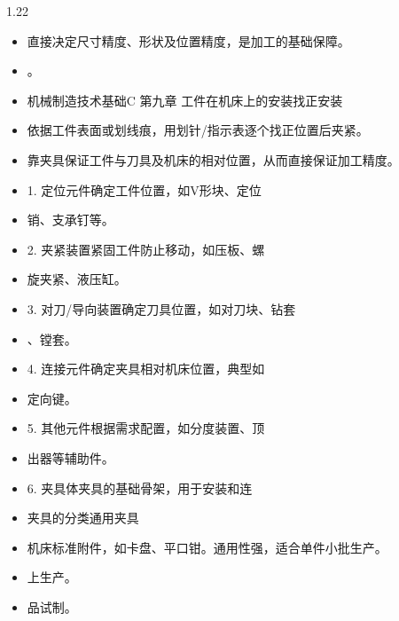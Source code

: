 \documentclass[12pt,a4paper]{article}
\begin{document}
\begin{spacing}{1.22}
\begin{itemize}[leftmargin=2.2em,label=--]
  \item 直接决定尺寸精度、形状及位置精度，是加工的基础保障。
  \item 。
  \item 机械制造技术基础C 第九章 工件在机床上的安装找正安装
  \item 依据工件表面或划线痕，用划针/指示表逐个找正位置后夹紧。
  \item 靠夹具保证工件与刀具及机床的相对位置，从而直接保证加工精度。
  \item 1. 定位元件确定工件位置，如V形块、定位
  \item 销、支承钉等。
  \item 2. 夹紧装置紧固工件防止移动，如压板、螺
  \item 旋夹紧、液压缸。
  \item 3. 对刀/导向装置确定刀具位置，如对刀块、钻套
  \item 、镗套。
  \item 4. 连接元件确定夹具相对机床位置，典型如
  \item 定向键。
  \item 5. 其他元件根据需求配置，如分度装置、顶
  \item 出器等辅助件。
  \item 6. 夹具体夹具的基础骨架，用于安装和连
  \item 夹具的分类通用夹具
  \item 机床标准附件，如卡盘、平口钳。通用性强，适合单件小批生产。
  \item 上生产。
  \item 品试制。
\end{itemize}


\end{spacing}
\end{document}
